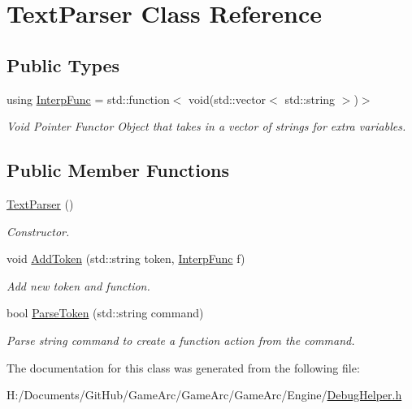 \hypertarget{class_text_parser}{\section{Text\+Parser Class Reference}
\label{class_text_parser}
}
\subsection*{Public Types}
\begin{DoxyCompactItemize}
\item 
\hypertarget{class_text_parser_a9cd16418d2032d830f4ed2c2624e703d}{using \hyperlink{class_text_parser_a9cd16418d2032d830f4ed2c2624e703d}{Interp\+Func} = std\+::function$<$ void(std\+::vector$<$ std\+::string $>$)$>$}\label{class_text_parser_a9cd16418d2032d830f4ed2c2624e703d}

\begin{DoxyCompactList}\small\item\em Void Pointer Functor Object that takes in a vector of strings for extra variables. \end{DoxyCompactList}\end{DoxyCompactItemize}
\subsection*{Public Member Functions}
\begin{DoxyCompactItemize}
\item 
\hypertarget{class_text_parser_a4438162fe3717258692da1bad6531872}{\hyperlink{class_text_parser_a4438162fe3717258692da1bad6531872}{Text\+Parser} ()}\label{class_text_parser_a4438162fe3717258692da1bad6531872}

\begin{DoxyCompactList}\small\item\em Constructor. \end{DoxyCompactList}\item 
\hypertarget{class_text_parser_a894db87b2458e4ac91789b9f4f2e77b1}{void \hyperlink{class_text_parser_a894db87b2458e4ac91789b9f4f2e77b1}{Add\+Token} (std\+::string token, \hyperlink{class_text_parser_a9cd16418d2032d830f4ed2c2624e703d}{Interp\+Func} f)}\label{class_text_parser_a894db87b2458e4ac91789b9f4f2e77b1}

\begin{DoxyCompactList}\small\item\em Add new token and function. \end{DoxyCompactList}\item 
\hypertarget{class_text_parser_a17835c24de0a4e8f7ae71e0391013121}{bool \hyperlink{class_text_parser_a17835c24de0a4e8f7ae71e0391013121}{Parse\+Token} (std\+::string command)}\label{class_text_parser_a17835c24de0a4e8f7ae71e0391013121}

\begin{DoxyCompactList}\small\item\em Parse string command to create a function action from the command. \end{DoxyCompactList}\end{DoxyCompactItemize}


The documentation for this class was generated from the following file\+:\begin{DoxyCompactItemize}
\item 
H\+:/\+Documents/\+Git\+Hub/\+Game\+Arc/\+Game\+Arc/\+Game\+Arc/\+Engine/\hyperlink{_debug_helper_8h}{Debug\+Helper.\+h}\end{DoxyCompactItemize}
